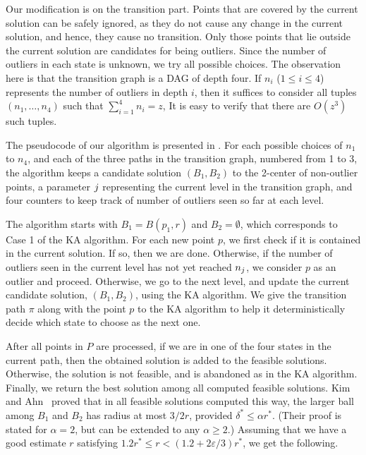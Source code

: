 \documentclass[envcountsame]{cls/cccg15}
\newcommand{\lee}{\leqslant}
\newcommand{\gee}{\geqslant}
\renewcommand{\le}{\lee}
\renewcommand{\ge}{\gee}
\newcommand{\eps}{\varepsilon}
\begin{document}
Our modification is on the transition part.
Points that are covered by the current solution can be safely ignored, 
as they do not cause any change in the current solution, and hence, they cause no transition.
Only those points that lie outside the current solution are candidates for being outliers.
Since the number of outliers in each state is unknown,
we try all possible choices. 
The observation here is that the transition graph is a DAG of depth four.
If $n_i$ ($1 \le i \le 4$) represents the number of outliers in depth $i$, 
then it suffices to consider all tuples $(n_1,\dots, n_4)$ such that $\sum_{i=1}^{4} n_i=z$,
It is easy to verify that there are $O(z^3)$ such tuples.

The pseudocode of our algorithm is presented in .
For each possible choices of $n_1$ to $n_4$, 
and each of the three paths in the transition graph, numbered from 1 to 3,
the algorithm keeps a candidate solution $(B_1, B_2)$ to the 2-center of non-outlier points,
a parameter ${j}$ representing the current level in the transition graph,
and four counters to keep track of number of outliers seen so far at each level.

The algorithm starts with $B_1 = B(p_1, r)$ and $B_2 = \emptyset$,
which corresponds to Case 1 of the KA algorithm.
For each new point $p$, we first check if it is contained in the current solution.
If so, then we are done.
Otherwise, if the number of outliers seen in the current level has not yet reached $n_{j}$, 
we consider $p$ as an outlier and proceed.
Otherwise, we go to the next level, and update the current candidate solution, 
$(B_1, B_2)$, using the KA algorithm.
We give the transition path $\pi$ along with the point $p$ to the KA algorithm
to help it deterministically decide which state to choose as the next one.

After all points in $P$ are processed, if we are in one of the four states in the current path,
then the obtained solution is added to the feasible solutions.
Otherwise, the solution is not feasible, and is abandoned as in the KA algorithm.
Finally, we return the best solution among all computed feasible solutions. 
Kim and Ahn~\cite{kim2014improved} proved that in all feasible solutions
computed this way,
the larger ball among $B_1$ and $B_2$ has radius at most $3/2r$,
provided $\delta^* \le \alpha r^*$.
(Their proof is stated for $\alpha = 2$, 
but can be extended to any $\alpha \ge 2$.)
Assuming that we have a good estimate $r$ satisfying
$1.2r^* \le r < (1.2 + 2\eps/3)r^*$,
we get the following.
\end{document}
